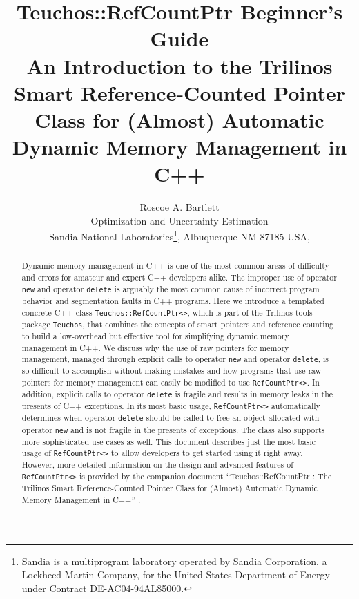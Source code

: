 \documentclass[pdf,ps2pdf,11pt]{SANDreport}
\title{\center
{\Huge\bf Teuchos::RefCountPtr Beginner's Guide}\\[1.5ex]
An Introduction to the Trilinos Smart Reference-Counted Pointer
Class for (Almost) Automatic Dynamic Memory Management in C++
}
\author{
Roscoe A. Bartlett \\ Optimization and Uncertainty Estimation \\
Sandia National Laboratories\footnote{
Sandia is a multiprogram laboratory operated by Sandia Corporation, a
Lockheed-Martin Company, for the United States Department of Energy
under Contract DE-AC04-94AL85000.}, Albuquerque NM 87185 USA, \\
}
\date{}
\begin{document}
\maketitle

%

%
\begin{abstract}
%
Dynamic memory management in C++ is one of the most common areas of
difficulty and errors for amateur and expert C++ developers alike.
The improper use of operator {}\texttt{new} and operator
{}\texttt{delete} is arguably the most common cause of incorrect
program behavior and segmentation faults in C++ programs.  Here we
introduce a templated concrete C++ class
{}\texttt{Teuchos\-::Ref\-Count\-Ptr<>}, which is part of the Trilinos
tools package {}\texttt{Teuchos}, that combines the concepts of smart
pointers and reference counting to build a low-overhead but effective
tool for simplifying dynamic memory management in C++.  We discuss why
the use of raw pointers for memory management, managed through
explicit calls to operator {}\texttt{new} and operator
{}\texttt{delete}, is so difficult to accomplish without making
mistakes and how programs that use raw pointers for memory management
can easily be modified to use {}\texttt{Ref\-Count\-Ptr<>}.  In
addition, explicit calls to operator {}\texttt{delete} is fragile and
results in memory leaks in the presents of C++ exceptions.  In its
most basic usage, {}\texttt{Ref\-Count\-Ptr<>} automatically
determines when operator {}\texttt{delete} should be called to free an
object allocated with operator {}\texttt{new} and is not fragile in
the presents of exceptions.  The class also supports more
sophisticated use cases as well.  This document describes just the
most basic usage of {}\texttt{Ref\-Count\-Ptr<>} to allow developers
to get started using it right away.  However, more detailed
information on the design and advanced features of
{}\texttt{Ref\-Count\-Ptr<>} is provided by the companion document
``Teuchos::RefCountPtr : The Trilinos Smart Reference-Counted Pointer
Class for (Almost) Automatic Dynamic Memory Management in C++''
{}\cite{ref:RefCountPtr}.
%
\end{abstract}
%

%
\clearpage
\end{document}

